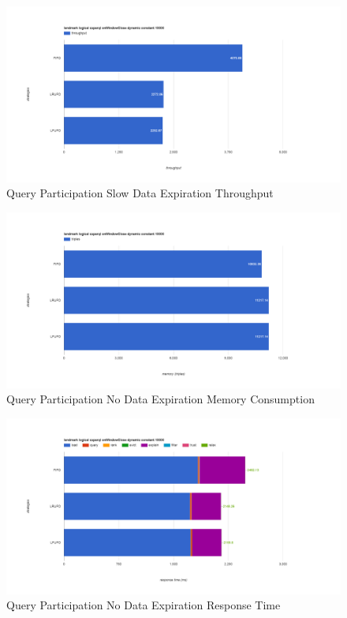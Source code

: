 \begin{figure}[!htbp]
    \centering
    \includegraphics[width=\textwidth]{img/app3-qp-slow-t.png}
    \caption{Query Participation Slow Data Expiration Throughput}
\end{figure}
\begin{figure}[!htbp]
    \centering
    \includegraphics[width=\textwidth]{img/app3-qp-no-m.png}
    \caption{Query Participation No Data Expiration Memory Consumption}
\end{figure}
\begin{figure}[!htbp]
    \centering
    \includegraphics[width=\textwidth]{img/app3-qp-no-r.png}
    \caption{Query Participation No Data Expiration Response Time}
\end{figure}
